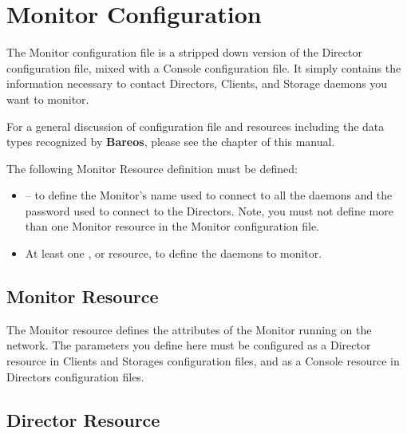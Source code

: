
\chapter{Monitor Configuration}
\label{_MonitorChapter}

The Monitor configuration file is a stripped down version of the Director
configuration file, mixed with a Console configuration file. It simply
contains the information necessary to contact Directors, Clients, and Storage
daemons you want to monitor.

For a general discussion of configuration file and resources including the
data types recognized by {\bf Bareos}, please see the
 chapter of this manual.

The following Monitor Resource definition must be defined:

\begin{itemize}
\item
{} -- to  define the Monitor's
name used to connect to all the daemons and  the password used to connect to
the Directors. Note, you must not  define more than one Monitor resource in
the  Monitor configuration file.

\item At least one
,
 or
 resource, to define the daemons to monitor.
\end{itemize}

\section{Monitor Resource}
\label{MonitorResource}

The Monitor resource defines the attributes of the Monitor running on the
network. The parameters you define here must be configured as a Director
resource in Clients and Storages configuration files, and as a Console
resource in Directors configuration files.





\section{Director Resource}
\label{DirectorResource2}

